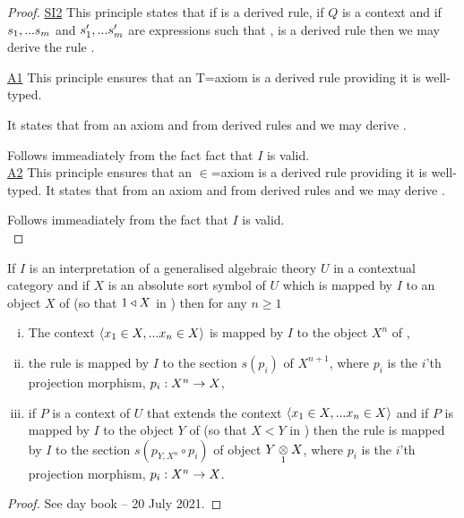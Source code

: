 \begin{proof}
\vspace{1cm}
\underline{SI2} 
This principle states that if  is a derived rule, if $Q$ is a context and if  $\sm$ and $\smp$ are expressions such that
\foreachj,  is a derived rule then we may derive the rule
. \\
\vspace{1cm}

\underline{A1} 
This principle ensures that an T=axiom is a derived rule providing it is well-typed.
 
It states that from an axiom  and from derived rules
 \ZDelta and \ZDeltap we may derive
.

\vspace{1cm}
Follows immeadiately from the fact fact that $I$ is  valid.\\

\underline{A2} 
This principle ensures that an $\in$=axiom is a derived rule providing it is well-typed.
It states that from an axiom  and from derived rules
 \ZtDelta and \ZtpDelta we may derive
.

\vspace{1cm}
Follows immeadiately from the fact that $I$ is  valid. \\

\end{proof}

\begin{lemma}
If $I$ is an interpretation of a generalised algebraic theory $U$ in a contextual category \catcw and if $X$ is an absolute sort symbol of $U$ which is mapped 
by $I$ to an object $X$ of \catcw (so that $1 \base X$ in \catc) then for any $n \geq 1$ 
\begin{enumerate}[(i)]
\item
The context $\tuple{\ofT{x_1}{X},...\ofT{x_n}{X}}$ is mapped by $I$ to the object $X^n$ of \catc,
\item the rule 
 is mapped by $I$ to the section $s(p_i)$ of $X^{n+1}$, where $p_i$ is the $i$'th projection morphism, $p_i: X^n \morph X$,
\item if $P$ is a context of $U$ that extends the context $\tuple{\ofT{x_1}{X},...\ofT{x_n}{X}}$ and if $P$ is mapped by $I$ to
the object $Y$ of \catcw (so that $X < Y$ in \catc) then the rule 
 is mapped by $I$ to the section $s(p_{Y,X^n}\circ p_i)$ of object $\crossx{Y}{X}{1}$, where $p_i$ is the $i$'th projection morphism, $p_i: X^n \morph X$.
\end{enumerate}
\end{lemma}
\begin{proof}
See day book -- 20 July 2021.
\end{proof}

